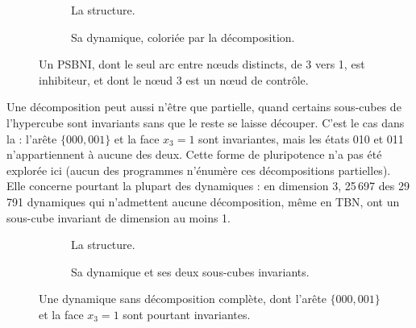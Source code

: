 \documentclass[12pt, a4paper]{article}
\begin{document}
\begin{figure}[H]
    \centering
    \begin{subfigure}{0.48\linewidth}
        \centering
        \caption{La structure.}
    \end{subfigure}
    \hfill
    \begin{subfigure}{0.48\linewidth}
        \centering
        \caption{Sa dynamique, coloriée par la décomposition.}
    \end{subfigure}
    \caption{Un PSBNI, dont le seul arc entre nœuds distincts, de 3 vers 1, est inhibiteur, et dont le nœud 3 est un nœud de contrôle.}
    \label{fig:psbni-3d}
\end{figure}

Une décomposition peut aussi n'être que partielle, quand certains sous-cubes de l'hypercube sont invariants sans que le reste se laisse découper.
C'est le cas dans la  : l'arête $\{000, 001\}$ et la face $x_3 = 1$ sont invariantes, mais les états 010 et 011 n'appartiennent à aucune des deux.
Cette forme de pluripotence n'a pas été explorée ici (aucun des programmes n'énumère ces décompositions partielles).
Elle concerne pourtant la plupart des dynamiques : en dimension 3, 25\,697 des 29\,791 dynamiques qui n'admettent aucune décomposition, même en TBN, ont un sous-cube invariant de dimension au moins 1.

\begin{figure}[H]
    \centering
    \begin{subfigure}{0.48\linewidth}
        \centering
        \caption{La structure.}
    \end{subfigure}
    \hfill
    \begin{subfigure}{0.48\linewidth}
        \centering
        \caption{Sa dynamique et ses deux sous-cubes invariants.}
    \end{subfigure}
    \caption{Une dynamique sans décomposition complète, dont l'arête $\{000, 001\}$ et la face $x_3 = 1$ sont pourtant invariantes.}
    \label{fig:partielle-3d}
\end{figure}
\end{document}

